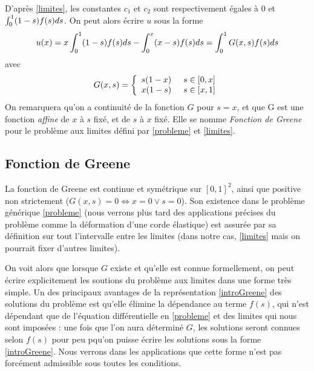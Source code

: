 \documentclass[12pt]{article}
\newcommand{\espace}{\hspace{5mm}}
\begin{document}
D'après \eqref{limites}, les constantes $c_1$ et $c_2$ sont respectivement égales à $0$ et $\int_0^1(1-s)f\relax(s)ds$.  On peut alors écrire $u$ sous la forme
\begin{equation} \label{introGreene}
u\relax(x) = x \int_0^1(1-s)f\relax(s)ds - \int_0^x (x-s)f\relax(s)ds = \int_0^1 G\relax(x, s) f\relax(s) ds
\end{equation}
avec 
\begin{equation}
G\relax(x, s) = \left\{
    \begin{array}{ll}
        s(1-x) \espace s\in [0,x] \\
        x(1-s) \espace s\in [x, 1]
    \end{array}
\right.
\end{equation}
On remarquera qu'on a continuité de la fonction $G$ pour $s = x$, et que G est une fonction \emph{affine} de $x$ à $s$ fixé, et de $s$ à $x$ fixé. Elle se nomme \emph{Fonction de Greene} pour le problème aux limites défini par \eqref{probleme} et \eqref{limites}.

\subsection{Fonction de Greene}
\quad La fonction de Greene est continue et symétrique sur $[0,1]^2$, ainsi que positive non strictement ($G(x,s) = 0 \Longleftrightarrow x = 0 \lor s = 0$). Son existence dans le problème générique \eqref{probleme} (nous verrons plus tard des applications précises du problème comme la déformation d'une corde élastique) est assurée par sa définition sur tout l'intervalle entre les limites (dans notre cas, \eqref{limites} mais on pourrait fixer d'autres limites). 

On voit alors que lorsque $G$ existe et qu'elle est connue formellement, on peut écrire explicitement les soutions du problème aux limites dans une forme très simple.  Un des principaux avantages de la représentation \eqref{introGreene} des solutions du problème est qu'elle élimine la dépendance au terme $f(s)$, qui n'est dépendant que de l'équation différentielle en \eqref{probleme} et des limites qui nous sont imposées : une fois que l'on aura déterminé $G$, les solutions seront connues selon $f(s)$ pour peu pqu'on puisse écrire les solutions sous la forme \eqref{introGreene}. Nous verrons dans les applications que cette forme n'est pas forcément admissible sous toutes les conditions. 
\end{document}
